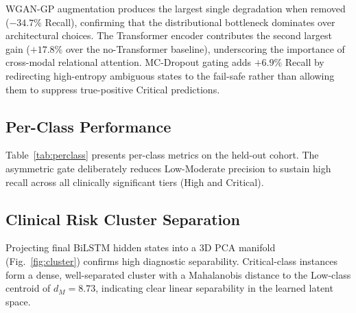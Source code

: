 \documentclass[conference]{IEEEtran}
\begin{document}
WGAN-GP augmentation produces the largest single degradation when
removed ($-34.7\%$ Recall), confirming that the distributional
bottleneck dominates over architectural choices.  The Transformer
encoder contributes the second largest gain ($+17.8\%$ over the
no-Transformer baseline), underscoring the importance of cross-modal
relational attention.  MC-Dropout gating adds $+6.9\%$ Recall by
redirecting high-entropy ambiguous states to the fail-safe rather than
allowing them to suppress true-positive Critical predictions.

\subsection{Per-Class Performance}
Table~\ref{tab:perclass} presents per-class metrics on the held-out
cohort.  The asymmetric gate deliberately reduces Low-Moderate
precision to sustain high recall across all clinically significant
tiers (High and Critical).

\begin{table}[h]
\caption{Per-Class Performance Metrics (Held-Out Cohort S9--S14)}
\label{tab:perclass}
\centering
{}
\end{table}

\subsection{Clinical Risk Cluster Separation}
Projecting final BiLSTM hidden states into a 3D PCA manifold
(Fig.~\ref{fig:cluster}) confirms high diagnostic separability.
Critical-class instances form a dense, well-separated cluster with a
Mahalanobis distance to the Low-class centroid of $d_M = 8.73$,
indicating clear linear separability in the learned latent space.
\end{document}
